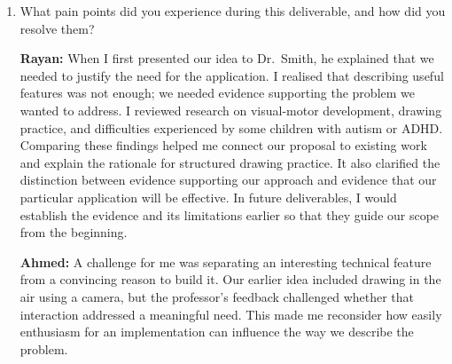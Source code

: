 \documentclass{article}
\begin{document}
\begin{enumerate}
\par\medskip
\textbf{Muhammad:} Our team connected easily around the high-level
idea and the problem we wanted to solve. This shared understanding helped us
align on the problem statement and goals, because we had a common purpose to
refer back to when discussing what belonged in the document. I found that
agreeing on the problem first made it easier to discuss goals without getting
drawn too early into implementation details. My main takeaway is that time
spent establishing a shared direction makes later decisions more focused and
helps individual contributions fit together.

\par\medskip
\textbf{Shamil:} The problem we chose to address already had research behind 
it with clearly defined stakeholders, namely primary school teachers and 
children/students. Our initial notes on the topic will translate easily into 
the literature review custom document. Our supervisor and TA both have 
background knowledge in education and thus directed us to clear and novel 
goals. Lastly, our team is excited about the project, so we successfully 
assigned tasks, built a workflow, and set up regular meetings with little 
conflict.

\item What pain points did you experience during this deliverable, and how did
you resolve them?

\textbf{Rayan:} When I first presented our idea to Dr.\ Smith, he explained that
we needed to justify the need for the application. I realised that describing
useful features was not enough; we needed evidence supporting the problem we
wanted to address. I reviewed research on visual-motor development, drawing
practice, and difficulties experienced by some children with autism or ADHD.
Comparing these findings helped me connect our proposal to existing work and
explain the rationale for structured drawing practice. It also clarified the
distinction between evidence supporting our approach and evidence that our
particular application will be effective. In future deliverables, I would
establish the evidence and its limitations earlier so that they guide our scope
from the beginning.

\par\medskip
\textbf{Ahmed:} A challenge for me was separating an
interesting technical feature from a convincing reason to build it.
Our earlier idea included drawing in the air using a camera, but the
professor's feedback challenged whether that interaction addressed a
meaningful need. This made me reconsider how easily enthusiasm for an
implementation can influence the way we describe the problem.


\end{enumerate}
\end{document}
